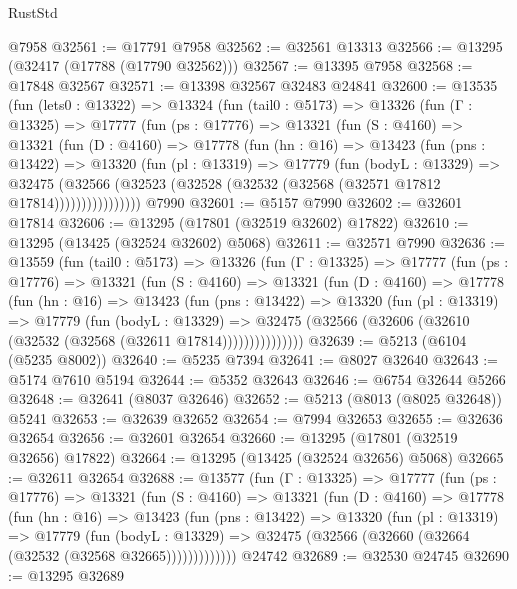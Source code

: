 \begin{lexlean}{RustStd}
\begin{coremodule}
    @7958
@32561 := @17791 @7958
@32562 := @32561 @13313
@32566 := @13295 (@32417 (@17788 (@17790 @32562)))
@32567 := @13395 @7958
@32568 := @17848 @32567
@32571 := @13398 @32567 @32483 @24841
@32600 := @13535
    (fun (lets0 : @13322) =>
    @13324
      (fun (tail0 : @5173) =>
      @13326
        (fun (Γ : @13325) =>
        @17777
          (fun (ps : @17776) =>
          @13321
            (fun (S : @4160) =>
            @13321
              (fun (D : @4160) =>
              @17778
                (fun (hn : @16) =>
                @13423
                  (fun (pns : @13422) =>
                  @13320
                    (fun (pl : @13319) =>
                    @17779
                      (fun (bodyL : @13329) =>
                      @32475
                        (@32566
                          (@32523 (@32528 (@32532 (@32568 (@32571 @17812 @17814))))))))))))))))
    @7990
@32601 := @5157 @7990
@32602 := @32601 @17814
@32606 := @13295 (@17801 (@32519 @32602) @17822)
@32610 := @13295 (@13425 (@32524 @32602) @5068)
@32611 := @32571 @7990
@32636 := @13559
    (fun (tail0 : @5173) =>
    @13326
      (fun (Γ : @13325) =>
      @17777
        (fun (ps : @17776) =>
        @13321
          (fun (S : @4160) =>
          @13321
            (fun (D : @4160) =>
            @17778
              (fun (hn : @16) =>
              @13423
                (fun (pns : @13422) =>
                @13320
                  (fun (pl : @13319) =>
                  @17779
                    (fun (bodyL : @13329) =>
                    @32475 (@32566 (@32606 (@32610 (@32532 (@32568 (@32611 @17814)))))))))))))))
@32639 := @5213 (@6104 (@5235 @8002))
@32640 := @5235 @7394
@32641 := @8027 @32640
@32643 := @5174 @7610 @5194
@32644 := @5352 @32643
@32646 := @6754 @32644 @5266
@32648 := @32641 (@8037 @32646)
@32652 := @5213 (@8013 (@8025 @32648)) @5241
@32653 := @32639 @32652
@32654 := @7994 @32653
@32655 := @32636 @32654
@32656 := @32601 @32654
@32660 := @13295 (@17801 (@32519 @32656) @17822)
@32664 := @13295 (@13425 (@32524 @32656) @5068)
@32665 := @32611 @32654
@32688 := @13577
    (fun (Γ : @13325) =>
    @17777
      (fun (ps : @17776) =>
      @13321
        (fun (S : @4160) =>
        @13321
          (fun (D : @4160) =>
          @17778
            (fun (hn : @16) =>
            @13423
              (fun (pns : @13422) =>
              @13320
                (fun (pl : @13319) =>
                @17779
                  (fun (bodyL : @13329) =>
                  @32475 (@32566 (@32660 (@32664 (@32532 (@32568 @32665)))))))))))))
    @24742
@32689 := @32530 @24745
@32690 := @13295 @32689

\end{coremodule}
\end{lexlean}
